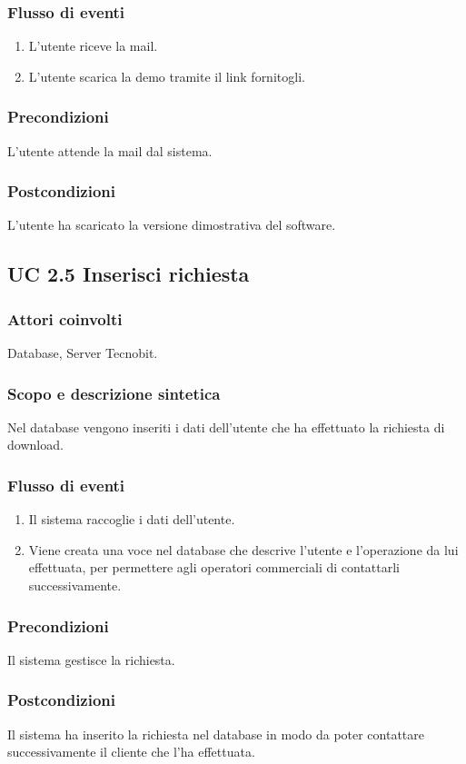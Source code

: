 \subsubsection*{Flusso di eventi}
\begin{enumerate}
\item L'utente riceve la mail.
\item L'utente scarica la demo tramite il link fornitogli.
\end{enumerate}
\subsubsection*{Precondizioni} L'utente attende la mail dal sistema.
\subsubsection*{Postcondizioni} L'utente ha scaricato la versione dimostrativa del software.

\subsection*{UC 2.5 Inserisci richiesta}
\subsubsection*{Attori coinvolti}  
Database, Server Tecnobit. 
\subsubsection*{Scopo e descrizione sintetica}
Nel database vengono inseriti i dati dell'utente che ha effettuato la richiesta di download. 
\subsubsection*{Flusso di eventi}
\begin{enumerate}
\item Il sistema raccoglie i dati dell'utente.
\item Viene creata una voce nel database che descrive l'utente e l'operazione da lui effettuata, per permettere agli 
operatori commerciali di contattarli successivamente.
\end{enumerate}
\subsubsection*{Precondizioni} Il sistema gestisce la richiesta.
\subsubsection*{Postcondizioni} Il sistema ha inserito la richiesta nel database in modo da poter contattare successivamente il cliente che l'ha effettuata.

